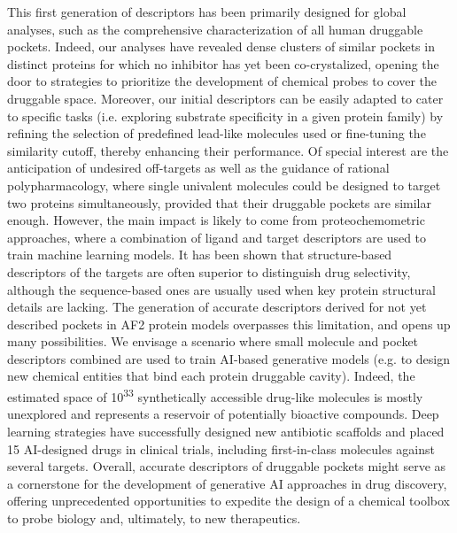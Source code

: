 This first generation of descriptors has been primarily designed for global analyses, such as the comprehensive characterization of all human druggable pockets. Indeed, our analyses have revealed dense clusters of similar pockets in distinct proteins for which no inhibitor has yet been co-crystalized, opening the door to strategies to prioritize the development of chemical probes to cover the druggable space\cite{carter_target_2019}. Moreover, our initial descriptors can be easily adapted to cater to specific tasks (i.e. exploring substrate specificity in a given protein family) by refining the selection of predefined lead-like molecules used or fine-tuning the similarity cutoff, thereby enhancing their performance. Of special interest are the anticipation of undesired off-targets as well as the guidance of rational polypharmacology, where single univalent molecules could be designed to target two proteins simultaneously, provided that their druggable pockets are similar enough\cite{duran-frigola_detecting_2017}. However, the main impact is likely to come from proteochemometric approaches, where a combination of ligand and target descriptors are used to train machine learning models\cite{fernandez-torras_connecting_2022}. It has been shown that structure-based descriptors of the targets are often superior to distinguish drug selectivity, although the sequence-based ones are usually used when key protein structural details are lacking\cite{bongers_proteochemometrics_2019}. The generation of accurate descriptors derived for not yet described pockets in AF2 protein models overpasses this limitation, and opens up many possibilities. We envisage a scenario where small molecule and pocket descriptors combined are used to train AI-based generative models (e.g. to design new chemical entities that bind each protein druggable cavity\cite{jin_hierarchical_2020, blaschke_reinvent_2020}). Indeed, the estimated space of 10\textsuperscript{33} synthetically accessible drug-like molecules is mostly unexplored and represents a reservoir of potentially bioactive compounds\cite{polishchuk_estimation_2013}. Deep learning strategies have successfully designed new antibiotic scaffolds\cite{wong_discovery_2024} and placed 15 AI-designed drugs in clinical trials, including first-in-class molecules against several targets\cite{jayatunga_ai_2022}. Overall, accurate descriptors of druggable pockets might serve as a cornerstone for the development of generative AI approaches in drug discovery, offering unprecedented opportunities to expedite the design of a chemical toolbox to probe biology and, ultimately, to new therapeutics.